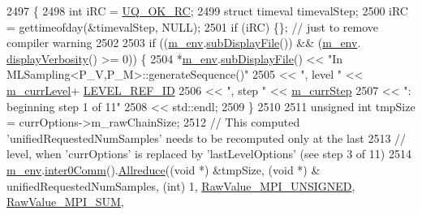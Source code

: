 \begin{DoxyCode}
2497 \{
2498   \textcolor{keywordtype}{int} iRC = \hyperlink{namespace_q_u_e_s_o_a8e909502900aecf24cedba022ea84471}{UQ\_OK\_RC};
2499   \textcolor{keyword}{struct }timeval timevalStep;
2500   iRC = gettimeofday(&timevalStep, NULL);
2501   \textcolor{keywordflow}{if} (iRC) \{\}; \textcolor{comment}{// just to remove compiler warning}
2502 
2503       \textcolor{keywordflow}{if} ((\hyperlink{class_q_u_e_s_o_1_1_m_l_sampling_a13f1ca4fe9f94822fe572a743eaced1d}{m\_env}.\hyperlink{class_q_u_e_s_o_1_1_base_environment_a8a0064746ae8dddfece4229b9ad374d6}{subDisplayFile}()) && (\hyperlink{class_q_u_e_s_o_1_1_m_l_sampling_a13f1ca4fe9f94822fe572a743eaced1d}{m\_env}.
      \hyperlink{class_q_u_e_s_o_1_1_base_environment_a1fe5f244fc0316a0ab3e37463f108b96}{displayVerbosity}() >= 0)) \{
2504         *\hyperlink{class_q_u_e_s_o_1_1_m_l_sampling_a13f1ca4fe9f94822fe572a743eaced1d}{m\_env}.\hyperlink{class_q_u_e_s_o_1_1_base_environment_a8a0064746ae8dddfece4229b9ad374d6}{subDisplayFile}() << \textcolor{stringliteral}{"In MLSampling<P\_V,P\_M>::generateSequence()"}
2505                                 << \textcolor{stringliteral}{", level "} << \hyperlink{class_q_u_e_s_o_1_1_m_l_sampling_af9416874c856e50f3b35270e801f17e4}{m\_currLevel}+
      \hyperlink{_m_l_sampling_level_options_8h_a68d15eaf394d210effcf584b938206d3}{LEVEL\_REF\_ID}
2506                                 << \textcolor{stringliteral}{", step "}  << \hyperlink{class_q_u_e_s_o_1_1_m_l_sampling_a1b1f8ccb4823bdfa26ec652f0807c63e}{m\_currStep}
2507                                 << \textcolor{stringliteral}{": beginning step 1 of 11"}
2508                                 << std::endl;
2509       \}
2510 
2511       \textcolor{keywordtype}{unsigned} \textcolor{keywordtype}{int} tmpSize = currOptions->m\_rawChainSize;
2512       \textcolor{comment}{// This computed 'unifiedRequestedNumSamples' needs to be recomputed only at the last}
2513       \textcolor{comment}{// level, when 'currOptions' is replaced by 'lastLevelOptions' (see step 3 of 11)}
2514       \hyperlink{class_q_u_e_s_o_1_1_m_l_sampling_a13f1ca4fe9f94822fe572a743eaced1d}{m\_env}.\hyperlink{class_q_u_e_s_o_1_1_base_environment_a689e4d140c74d495d97eb498714a4b82}{inter0Comm}().\hyperlink{class_q_u_e_s_o_1_1_mpi_comm_a72e137e60ef8060efb1ee5fc874fa4b8}{Allreduce}((\textcolor{keywordtype}{void} *) &tmpSize, (\textcolor{keywordtype}{void} *) &
      unifiedRequestedNumSamples, (\textcolor{keywordtype}{int}) 1, \hyperlink{_mpi_comm_8h_a06cbfbc33436f6e0dc8a48ff3c49bdfc}{RawValue\_MPI\_UNSIGNED}, \hyperlink{_mpi_comm_8h_afbf78d291c032aa7f512bc566cee2bd1}{RawValue\_MPI\_SUM},

\end{DoxyCode}

